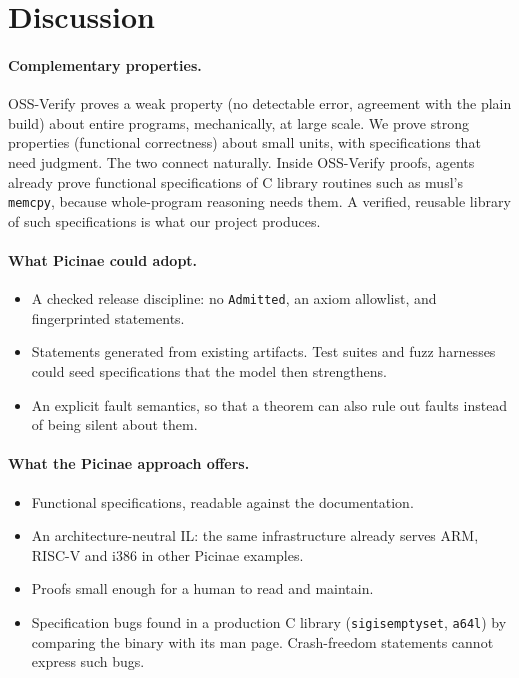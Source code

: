 \documentclass[11pt]{article}
\newcommand{\code}[1]{\texttt{#1}}
\begin{document}
\section{Discussion}\label{sec:discussion}

\paragraph{Complementary properties.}
OSS-Verify proves a weak property (no detectable error, agreement with the
plain build) about entire programs, mechanically, at large scale.  We prove
strong properties (functional correctness) about small units, with
specifications that need judgment.  The two connect naturally.  Inside
OSS-Verify proofs, agents already prove functional specifications of C
library routines such as musl's \code{memcpy}, because whole-program
reasoning needs them.  A verified, reusable library of such specifications
is what our project produces.

\paragraph{What Picinae could adopt.}
\begin{itemize}[nosep]
\item A checked release discipline: no \code{Admitted}, an axiom allowlist,
      and fingerprinted statements.
\item Statements generated from existing artifacts.  Test suites and fuzz
      harnesses could seed specifications that the model then strengthens.
\item An explicit fault semantics, so that a theorem can also rule out
      faults instead of being silent about them.
\end{itemize}

\paragraph{What the Picinae approach offers.}
\begin{itemize}[nosep]
\item Functional specifications, readable against the documentation.
\item An architecture-neutral IL: the same infrastructure already serves
      ARM, RISC-V and i386 in other Picinae examples.
\item Proofs small enough for a human to read and maintain.
\item Specification bugs found in a production C library (\code{sigisemptyset},
      \code{a64l}) by comparing the binary with its man page.  Crash-freedom
      statements cannot express such bugs.
\end{itemize}
\end{document}
